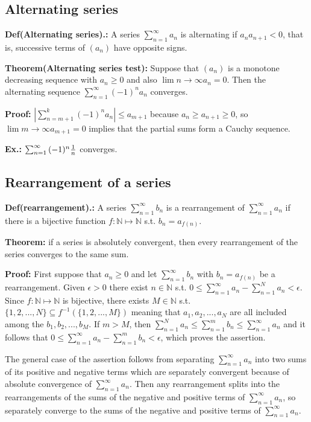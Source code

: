 \documentclass{article}
\begin{document}
\subsection{Alternating series}

\textbf{Def(Alternating series).:} A series $\sum_{n=1}^{\infty}{a_n}$  is alternating if $a_na_{n+1} < 0$, that is, successive terms of $(a_n)$ have opposite signs.

\textbf{Theorem(Alternating series test):} Suppose that $(a_n)$ is a monotone decreasing sequence with $a_n\geq 0$ and also $\lim{n\to \infty}a_n=0$. Then the alternating sequence $\sum_{n=1}^{\infty}{(-1)^{n}a_n}$ converges.

\textbf{Proof:} $|\sum_{n=m+1}^{k}{(-1)^{n}a_n}|\leq a_{m+1}$ because $a_n\geq a_{n+1}\geq 0$, so $\lim{m\to \infty}a_{m+1}=0$ implies that the partial sums form a Cauchy sequence.

\textbf{Ex.:} $\sum_{n=1}^{\infty}{(-1)^{n}{1\over n}}$ converges.

\subsection{Rearrangement of a series}

\textbf{Def(rearrangement).:} A series $\sum_{n=1}^{\infty}{b_n}$ is a rearrangement of $\sum_{n=1}^{\infty}{a_n}$ if there is a bijective function $f:\mathbb{N}\mapsto \mathbb{N}$ s.t. $b_n=a_{f(n)}$.

\textbf{Theorem:} if a series is absolutely convergent, then every rearrangement of the series converges to the same sum.

\textbf{Proof:} First suppose that $a_n\geq 0$ and let $\sum_{n=1}^{\infty}{b_n}$  with $b_n=a_{f(n)}$ be a rearrangement. Given $\epsilon > 0$ there exist $n\in \mathbb{N}$ s.t. $0\leq \sum_{n=1}^{\infty}{a_n} - \sum_{n=1}^{N}{a_n}<\epsilon$. Since $f:\mathbb{N} \mapsto \mathbb{N}$ is bijective, there exists $M\in \mathbb{N}$ s.t. $\{1,2,...,N\}\subseteq f^{-1}(\{1,2,...,M\})$ meaning that $a_1, a_2, ..., a_N$ are all included among the $b_1, b_2, ..., b_M$. If $m>M$, then $\sum_{n=1}^{N}{a_n}\leq \sum_{n=1}^{m}{b_n}\leq \sum_{n=1}^{\infty}{a_n}$ and it follows that $0\leq \sum_{n=1}^{\infty}{a_n}-\sum_{n=1}^{m}{b_n}<\epsilon $, which proves the assertion.

The general case of the assertion follows from separating $\sum_{n=1}^{\infty}{a_n}$ into two sums of its positive and negative terms which are separately convergent because of absolute convergence of $\sum_{n=1}^{\infty}{a_n}$. Then any rearrangement splits into the rearrangements of the sums of the negative and positive terms of $\sum_{n=1}^{\infty}{a_n}$, so separately converge to the sums of the negative and positive terms of $\sum_{n=1}^{\infty}{a_n}$.
\end{document}
